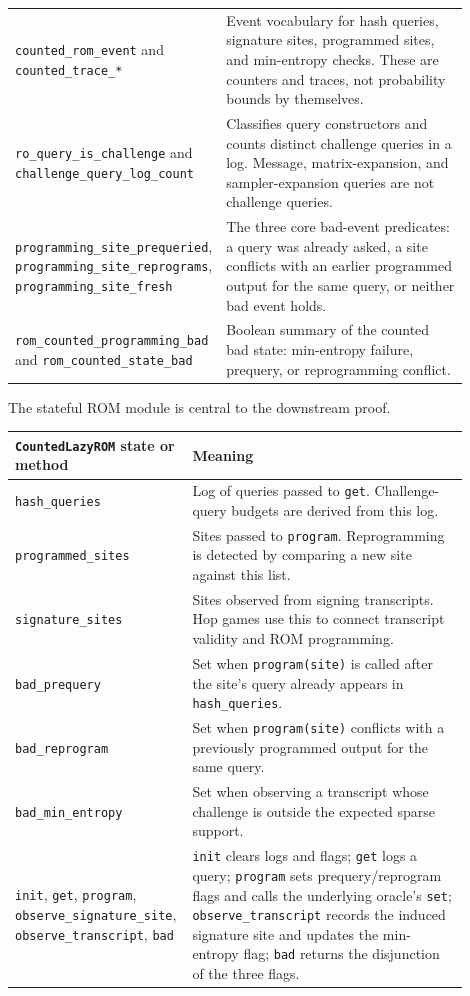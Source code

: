 \documentclass[11pt]{report}
\DeclareRobustCommand{\ec}[1]{\ifmmode\text{\nolinkurl{#1}}\else\nolinkurl{#1}\fi}
\theoremstyle{definition}
\theoremstyle{plain}
\begin{document}
\begin{longtable}{p{0.30\linewidth}p{0.60\linewidth}}
\ec{counted\_rom\_event} and \ec{counted\_trace\_*} &
Event vocabulary for hash queries, signature sites, programmed sites, and
min-entropy checks.  These are counters and traces, not probability bounds by
themselves. \\
\ec{ro\_query\_is\_challenge} and
\ec{challenge\_query\_log\_count} &
Classifies query constructors and counts distinct challenge queries in a log.
Message, matrix-expansion, and sampler-expansion queries are not challenge
queries. \\
\ec{programming\_site\_prequeried},
\ec{programming\_site\_reprograms},
\ec{programming\_site\_fresh} &
The three core bad-event predicates: a query was already asked, a site conflicts
with an earlier programmed output for the same query, or neither bad event
holds. \\
\ec{rom\_counted\_programming\_bad} and
\ec{rom\_counted\_state\_bad} &
Boolean summary of the counted bad state: min-entropy failure, prequery, or
reprogramming conflict. \\
\bottomrule
\end{longtable}

The stateful ROM module is central to the downstream proof.

\begin{longtable}{p{0.30\linewidth}p{0.60\linewidth}}
\toprule
\textbf{\ec{CountedLazyROM} state or method} & \textbf{Meaning} \\
\midrule
\ec{hash\_queries} &
Log of queries passed to \ec{get}.  Challenge-query budgets are derived from
this log. \\
\ec{programmed\_sites} &
Sites passed to \ec{program}.  Reprogramming is detected by comparing a new
site against this list. \\
\ec{signature\_sites} &
Sites observed from signing transcripts.  Hop games use this to connect
transcript validity and ROM programming. \\
\ec{bad\_prequery} &
Set when \ec{program(site)} is called after the site's query already appears in
\ec{hash\_queries}. \\
\ec{bad\_reprogram} &
Set when \ec{program(site)} conflicts with a previously programmed output for
the same query. \\
\ec{bad\_min\_entropy} &
Set when observing a transcript whose challenge is outside the expected sparse
support. \\
\ec{init}, \ec{get}, \ec{program},
\ec{observe\_signature\_site},
\ec{observe\_transcript}, \ec{bad} &
\ec{init} clears logs and flags; \ec{get} logs a query; \ec{program} sets
prequery/reprogram flags and calls the underlying oracle's \ec{set};
\ec{observe\_transcript} records the induced signature site and updates the
min-entropy flag; \ec{bad} returns the disjunction of the three flags. \\
\bottomrule
\end{longtable}
\end{document}
